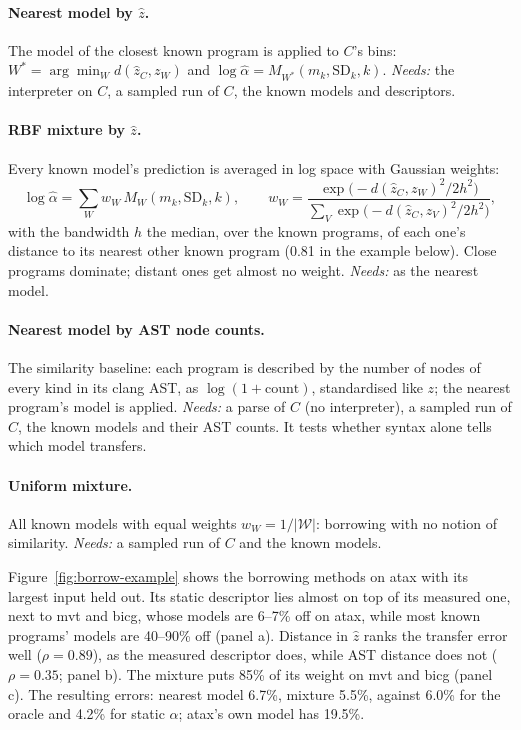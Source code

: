 \documentclass[11pt]{article}
\newcommand{\figref}[1]{Figure~\ref{#1}}
\begin{document}
\paragraph{Nearest model by $\hat z$.} The model of the closest known program is applied to $C$'s bins:
$W^* = \arg\min_W d(\hat z_C, z_W)$ and $\log\hat\alpha = M_{W^*}(m_k, \mathrm{SD}_k, k)$. \emph{Needs:} the
interpreter on $C$, a sampled run of $C$, the known models and descriptors.

\paragraph{RBF mixture by $\hat z$.} Every known model's prediction is averaged in log space with Gaussian weights:
\begin{equation}
\log\hat\alpha = \sum_W w_W\, M_W(m_k, \mathrm{SD}_k, k), \qquad
w_W = \frac{\exp\!\big(-d(\hat z_C, z_W)^2 / 2h^2\big)}{\sum_{V} \exp\!\big(-d(\hat z_C, z_V)^2 / 2h^2\big)} ,
\end{equation}
with the bandwidth $h$ the median, over the known programs, of each one's distance to its nearest other known program
(0.81 in the example below). Close programs dominate; distant ones get almost no weight. \emph{Needs:} as the
nearest model.

\paragraph{Nearest model by AST node counts.} The similarity baseline: each program is described by the number of
nodes of every kind in its clang AST, as $\log(1 + \text{count})$, standardised like $z$; the nearest program's model
is applied. \emph{Needs:} a parse of $C$ (no interpreter), a sampled run of $C$, the known models and their AST
counts. It tests whether syntax alone tells which model transfers.

\paragraph{Uniform mixture.} All known models with equal weights $w_W = 1/|\mathcal{W}|$: borrowing with no notion of
similarity. \emph{Needs:} a sampled run of $C$ and the known models.

\figref{fig:borrow-example} shows the borrowing methods on atax with its largest input held out. Its static descriptor
lies almost on top of its measured one, next to mvt and bicg, whose models are 6--7\% off on atax, while most known
programs' models are 40--90\% off (panel a). Distance in $\hat z$ ranks the transfer error well ($\rho = 0.89$), as
the measured descriptor does, while AST distance does not ($\rho = 0.35$; panel b). The mixture puts 85\% of its weight
on mvt and bicg (panel c). The resulting errors: nearest model 6.7\%, mixture 5.5\%, against 6.0\% for the oracle
and 4.2\% for static $\alpha$; atax's own model has 19.5\%.
\end{document}
